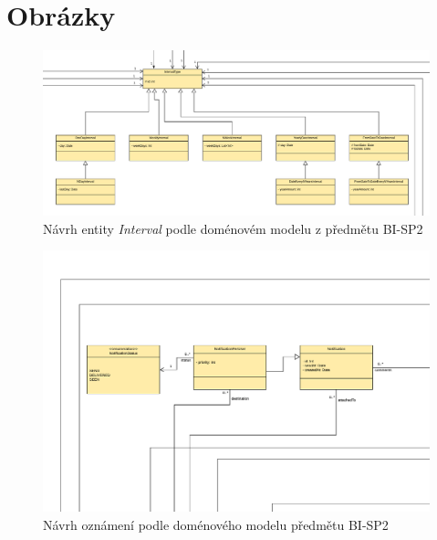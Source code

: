 \chapter{Obrázky}\label{dodatek:images}
    \begin{figure}\centering
        \includegraphics[angle=90, height=1.0\textheight]{pdfs/Interval1}
        \caption[Současný návrh entity \texttt{Interval}]{Návrh entity \textit{Interval} podle doménovém modelu z předmětu BI-SP2}\label{image:Interval1}
    \end{figure}
    \begin{figure}\centering
            \includegraphics[angle=90, height=1.0\textheight]{pdfs/Notification1}
            \caption[Předchozí návrh oznámení]{Návrh oznámení podle doménového modelu předmětu BI-SP2}\label{image:notification1}
        \end{figure}
